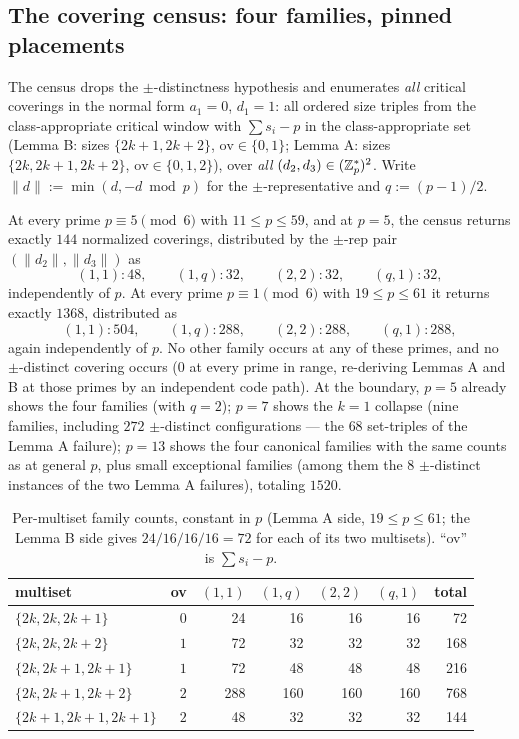\subsection{The covering census: four families, pinned placements}
\label{sec:gt-census}

The census drops the $\pm$-distinctness hypothesis and enumerates
\emph{all} critical coverings in the normal form $a_1=0$, $d_1=1$: all
ordered size triples from the class-appropriate critical window with
$\sum s_i-p$ in the class-appropriate set (Lemma B: sizes
$\{2k{+}1,2k{+}2\}$, $\mathrm{ov}\in\{0,1\}$; Lemma A: sizes
$\{2k,2k{+}1,2k{+}2\}$, $\mathrm{ov}\in\{0,1,2\}$), over \emph{all}
$(d_2,d_3)\in(\mathbb{Z}_p^{*})^2$. Write $\|d\|:=\min(d,-d \bmod p)$ for the
$\pm$-representative and $q:=(p-1)/2$.

\begin{proposition}\label{prop:census}
At every prime $p\equiv5\pmod 6$ with $11\le p\le 59$, and at $p=5$, the
census returns exactly $144$ normalized coverings, distributed by the
$\pm$-rep pair $(\|d_2\|,\|d_3\|)$ as
\[
(1,1):48,\qquad (1,q):32,\qquad (2,2):32,\qquad (q,1):32,
\]
independently of $p$. At every prime $p\equiv1\pmod 6$ with $19\le p\le 61$
it returns exactly $1368$, distributed as
\[
(1,1):504,\qquad (1,q):288,\qquad (2,2):288,\qquad (q,1):288,
\]
again independently of $p$. No other family occurs at any of these primes,
and no $\pm$-distinct covering occurs ($0$ at every prime in range,
re-deriving Lemmas A and B at those primes by an independent code path).
At the boundary, $p=5$ already shows the four families (with $q=2$); $p=7$
shows the $k=1$ collapse (nine families, including $272$ $\pm$-distinct
configurations --- the $68$ set-triples of the Lemma A failure); $p=13$
shows the four canonical families with the same counts as at general $p$,
plus small exceptional families (among them the $8$ $\pm$-distinct
instances of the two Lemma A failures), totaling $1520$.
\end{proposition}

\begin{table}[t]
\centering
\small
\caption{Per-multiset family counts, constant in $p$ (Lemma A side, $19\le
p\le 61$; the Lemma B side gives $24/16/16/16=72$ for each of its two
multisets). ``ov'' is $\sum s_i-p$.}
\label{tab:permultiset}
\begin{tabular}{@{}lrrrrrr@{}}
\toprule
multiset & ov & $(1,1)$ & $(1,q)$ & $(2,2)$ & $(q,1)$ & total \\
\midrule
$\{2k,2k,2k{+}1\}$ & $0$ & 24 & 16 & 16 & 16 & 72 \\
$\{2k,2k,2k{+}2\}$ & $1$ & 72 & 32 & 32 & 32 & 168 \\
$\{2k,2k{+}1,2k{+}1\}$ & $1$ & 72 & 48 & 48 & 48 & 216 \\
$\{2k,2k{+}1,2k{+}2\}$ & $2$ & 288 & 160 & 160 & 160 & 768 \\
$\{2k{+}1,2k{+}1,2k{+}1\}$ & $2$ & 48 & 32 & 32 & 32 & 144 \\
\bottomrule
\end{tabular}
\end{table}

